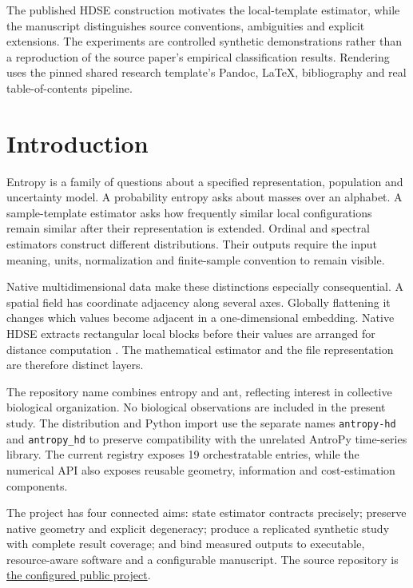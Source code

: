 \documentclass[
  english,
  11pt,
]{article}
\begin{document}
The published HDSE construction motivates the local-template estimator,
while the manuscript distinguishes source conventions, ambiguities and
explicit extensions. The experiments are controlled synthetic
demonstrations rather than a reproduction of the source paper's
empirical classification results. Rendering uses the pinned shared
research template's Pandoc, LaTeX, bibliography and real
table-of-contents pipeline.

\section{Introduction}\label{sec:introduction}

Entropy is a family of questions about a specified representation,
population and uncertainty model. A probability entropy asks about
masses over an alphabet. A sample-template estimator asks how frequently
similar local configurations remain similar after their representation
is extended. Ordinal and spectral estimators construct different
distributions. Their outputs require the input meaning, units,
normalization and finite-sample convention to remain visible.

Native multidimensional data make these distinctions especially
consequential. A spatial field has coordinate adjacency along several
axes. Globally flattening it changes which values become adjacent in a
one-dimensional embedding. Native HDSE extracts rectangular local blocks
before their values are arranged for distance computation
\citep{xia2026hdse}. The mathematical estimator and the file
representation are therefore distinct layers.

The repository name combines entropy and ant, reflecting interest in
collective biological organization. No biological observations are
included in the present study. The distribution and Python import use
the separate names \texttt{antropy-hd} and \texttt{antropy\_hd} to
preserve compatibility with the unrelated AntroPy time-series library.
The current registry exposes 19 orchestratable entries, while the
numerical API also exposes reusable geometry, information and
cost-estimation components.

The project has four connected aims: state estimator contracts
precisely; preserve native geometry and explicit degeneracy; produce a
replicated synthetic study with complete result coverage; and bind
measured outputs to executable, resource-aware software and a
configurable manuscript. The source repository is
\href{https://github.com/docxology/antropy}{the configured public
project}.
\end{document}
